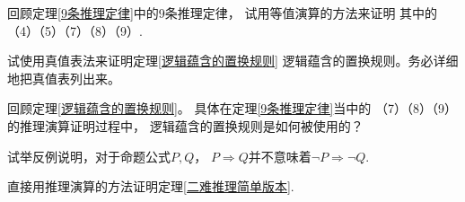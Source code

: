 \begin{prob}[基本推理定律的验证]
回顾定理\ref{9条推理定律}中的9条推理定律，
试用等值演算的方法来证明
其中的（4）（5）（7）（8）（9）.
\end{prob}\vs

\begin{prob}[真值表法的尝试]
试使用真值表法来证明定理\ref{逻辑蕴含的置换规则}
逻辑蕴含的置换规则。务必详细地把真值表列出来。
\end{prob}\vs

\begin{prob}[逻辑蕴含的置换规则的使用]
回顾定理\ref{逻辑蕴含的置换规则}。
具体在定理\ref{9条推理定律}当中的
（7）（8）（9）的推理演算证明过程中，
逻辑蕴含的置换规则是如何被使用的？
\end{prob}\vs

\begin{prob}试举反例说明，对于命题公式$P,Q$，
$P\Rightarrow Q$并不意味着$\neg P\Rightarrow \neg Q$.
\end{prob}\vs

\begin{prob}[二难推理简单版本]
直接用推理演算的方法证明定理\ref{二难推理简单版本}.
\end{prob}\vs







